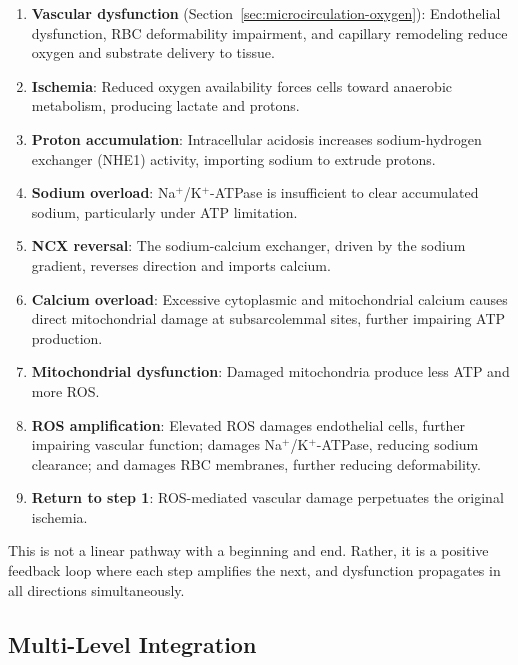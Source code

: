 \begin{enumerate}
    \item \textbf{Vascular dysfunction} (Section~\ref{sec:microcirculation-oxygen}): Endothelial dysfunction, RBC deformability impairment, and capillary remodeling reduce oxygen and substrate delivery to tissue.

    \item \textbf{Ischemia}: Reduced oxygen availability forces cells toward anaerobic metabolism, producing lactate and protons.

    \item \textbf{Proton accumulation}: Intracellular acidosis increases sodium-hydrogen exchanger (NHE1) activity, importing sodium to extrude protons.

    \item \textbf{Sodium overload}: Na$^+$/K$^+$-ATPase is insufficient to clear accumulated sodium, particularly under ATP limitation.

    \item \textbf{NCX reversal}: The sodium-calcium exchanger, driven by the sodium gradient, reverses direction and imports calcium.

    \item \textbf{Calcium overload}: Excessive cytoplasmic and mitochondrial calcium causes direct mitochondrial damage at subsarcolemmal sites, further impairing ATP production.

    \item \textbf{Mitochondrial dysfunction}: Damaged mitochondria produce less ATP and more ROS.

    \item \textbf{ROS amplification}: Elevated ROS damages endothelial cells, further impairing vascular function; damages Na$^+$/K$^+$-ATPase, reducing sodium clearance; and damages RBC membranes, further reducing deformability.

    \item \textbf{Return to step 1}: ROS-mediated vascular damage perpetuates the original ischemia.
\end{enumerate}

This is not a linear pathway with a beginning and end. Rather, it is a positive feedback loop where each step amplifies the next, and dysfunction propagates in all directions simultaneously.

\subsection{Multi-Level Integration}

